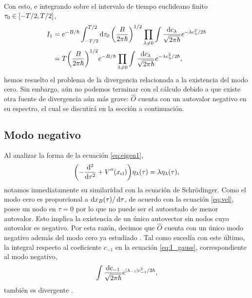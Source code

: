 Con esto, e integrando sobre el intervalo de tiempo euclideano finito $\tau_0 \in \qty[-T/2, T/2]$, %
\begin{align}
	I_1 &= e^{-B/\hbar} \int_{-T/2}^{T/2} \dd{\tau_0}\qty(\frac{B}{2\pi \hbar})^{1/2} \prod_{\lambda \neq 0} \int  \frac{\dd{c_\lambda}}{\sqrt{2\pi \hbar}} e^{-\lambda c_\lambda^2/2\hbar}  \\
	&= T\qty(\frac{B}{2\pi \hbar})^{1/2} e^{-B/\hbar}  \prod_{\lambda \neq 0} \int \frac{\dd{c_\lambda}}{\sqrt{2\pi \hbar}} e^{-\lambda c_\lambda^2/2\hbar},
\end{align}
hemos resuelto el problema de la divergencia relacionada a la existencia del modo cero. Sin embargo, aún no podemos terminar con el cálculo debido a que existe otra fuente de divergencia aún más grave: $\hat{O}$ cuenta con un autovalor negativo en su espectro, el cual se discutirá en la sección a continuación.  

\subsection{Modo negativo} 

Al analizar la forma de la ecuación \eqref{eq:eigen1},
\begin{equation} 
\qty( - \dv[2]{\tau} + V''\qty(x_{\text{cl}})) \eta_\lambda\qty(\tau) = \lambda \eta_\lambda\qty(\tau),
\end{equation}
notamos inmediatamente su similaridad con la ecuación de Schr\"{o}dinger. Como el modo cero es proporcional a $\dd{x_B\qty(\tau)/\dd{\tau}}$, de acuerdo con la ecuación \eqref{eq:vel}, posee un nodo en $\tau = 0$ por lo que no puede ser el autoestado de menor autovalor. Esto implica la existencia de un único autovector sin nodos cuyo autovalor es negativo. Por esta razón, decimos que $\hat{O}$ cuenta con un único modo negativo  además del modo cero ya estudiado \cite{callan1977fate}. Tal como sucedía con este último,
la integral respecto al coeficiente $c_{-1}$ en la ecuación \eqref{eq:I_gauss}, correspondiente al modo negativo,
\begin{equation} \label{eq:integral_negativo}
\int \frac{\dd{c_{-1}}}{\sqrt{2\pi \hbar}}e^{\qty|\lambda_{-1}|c_{-1}^2/2\hbar},
\end{equation}
también es divergente%
. 

